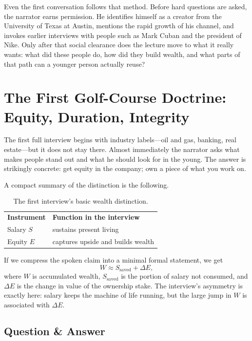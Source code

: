 Even the first conversation follows that method. Before hard questions are asked, the narrator earns permission. He identifies himself as a creator from the University of Texas at Austin, mentions the rapid growth of his channel, and invokes earlier interviews with people such as Mark Cuban and the president of Nike. Only after that social clearance does the lecture move to what it really wants: what did these people do, how did they build wealth, and what parts of that path can a younger person actually reuse?

\section{The First Golf-Course Doctrine: Equity, Duration, Integrity}

The first full interview begins with industry labels---oil and gas, banking, real estate---but it does not stay there. Almost immediately the narrator asks what makes people stand out and what he should look for in the young. The answer is strikingly concrete: get equity in the company; own a piece of what you work on.

A compact summary of the distinction is the following.
\begin{table}[h]
\centering
\begin{tabular}{ll}
\textbf{Instrument} & \textbf{Function in the interview} \\
Salary $S$ & sustains present living \\
Equity $E$ & captures upside and builds wealth
\end{tabular}
\caption{The first interview's basic wealth distinction.}
\end{table}

If we compress the spoken claim into a minimal formal statement, we get
\begin{equation}
W \approx S_{\mathrm{saved}} + \Delta E,
\end{equation}
where $W$ is accumulated wealth, $S_{\mathrm{saved}}$ is the portion of salary not consumed, and $\Delta E$ is the change in value of the ownership stake. The interview's asymmetry is exactly here: salary keeps the machine of life running, but the large jump in $W$ is associated with $\Delta E$.

\subsection{Question \& Answer}

